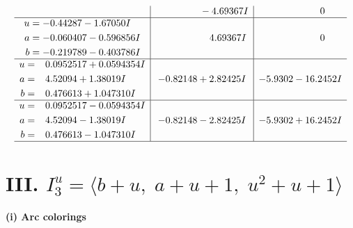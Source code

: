\documentclass[1p]{elsarticle_modified}
\theoremstyle{definition}
\begin{document}
$$\begin{array}{c|c|c}
 & \phantom{-0.000000 } -4.69367 I & \phantom{-0.000000 } 0 \\ \hline\begin{aligned}
u &= -0.44287 - 1.67050 I \\
a &= -0.060407 - 0.596856 I \\
b &= -0.219789 - 0.403786 I\end{aligned}
 & \phantom{-0.000000 -}4.69367 I & \phantom{-0.000000 } 0 \\ \hline\begin{aligned}
u &= \phantom{-}0.0952517 + 0.0594354 I \\
a &= \phantom{-}4.52094 + 1.38019 I \\
b &= \phantom{-}0.476613 + 1.047310 I\end{aligned}
 & -0.82148 + 2.82425 I & -5.9302 - 16.2452 I \\ \hline\begin{aligned}
u &= \phantom{-}0.0952517 - 0.0594354 I \\
a &= \phantom{-}4.52094 - 1.38019 I \\
b &= \phantom{-}0.476613 - 1.047310 I\end{aligned}
 & -0.82148 - 2.82425 I & -5.9302 + 16.2452 I\\
 \hline 
 \end{array}$$\newpage\newpage\renewcommand{\arraystretch}{1}
\centering \section*{III. $I^u_{3}= \langle b+u,\;a+u+1,\;u^2+u+1 \rangle$}
\flushleft \textbf{(i) Arc colorings}\\
\end{document}

